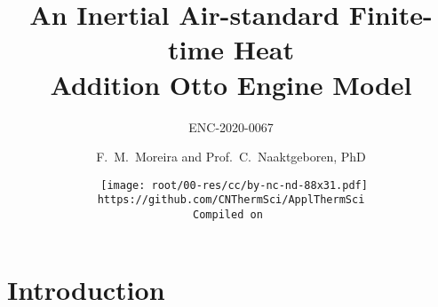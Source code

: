 \makeatletter
\immediate{} %
\makeatother



\newcommand{\VPMS}{{\ensuremath V_{\mathrm{PMS}}}}
\newcommand{\VPMI}{{\ensuremath V_{\mathrm{PMI}}}}
\title{An Inertial Air-standard Finite-time Heat\\ Addition Otto Engine Model}
\subtitle{ENC-2020-0067}
\author{F.~M.~Moreira and Prof.~C.~Naaktgeboren, PhD}
\date{{\scriptsize\tt%
    \texttt{[image: root/00-res/cc/by-nc-nd-88x31.pdf]}\\[\smallskipamount]
    https://github.com/CNThermSci/ApplThermSci\\
    Compiled on 
}}

\frame{\titlepage}
\frame{\tableofcontents}

\section{Introduction}


